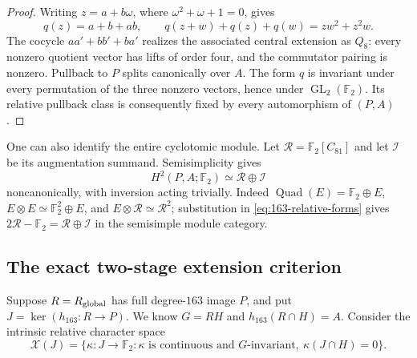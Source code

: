 \begin{proof}
Writing \(z=a+b\omega\), where
\(\omega^2+\omega+1=0\), gives
\[
 q(z)=a+b+ab,\qquad
 q(z+w)+q(z)+q(w)=zw^2+z^2w.
\]
The cocycle
\(aa'+bb'+ba'\) realizes the associated central extension
as \(Q_8\): every nonzero quotient vector has lifts of
order four, and the commutator pairing is nonzero.
Pullback to \(P\) splits canonically over \(A\).
The form \(q\) is invariant under every permutation
of the three nonzero vectors, hence under
\(\operatorname{GL}_2(\mathbb F_2)\).
Its relative pullback class is consequently fixed by
every automorphism of \((P,A)\).
\end{proof}

One can also identify the entire cyclotomic module.
Let \(\mathcal R=\mathbb F_2[C_{81}]\) and let
\(\mathcal I\) be its augmentation summand.
Semisimplicity gives
\[
 H^2(P,A;\mathbb F_2)\simeq\mathcal R\oplus\mathcal I
\]
noncanonically, with inversion acting trivially.
Indeed \(\operatorname{Quad}(E)=\mathbb F_2\oplus E\),
\(E\otimes E\simeq\mathbb F_2^2\oplus E\), and
\(E\otimes\mathcal R\simeq\mathcal R^2\); substitution
in \eqref{eq:163-relative-forms} gives
\(2\mathcal R-\mathbb F_2=\mathcal R\oplus\mathcal I\)
in the semisimple module category.

\subsection{The exact two-stage extension criterion}

Suppose \(R=R_{\rm global}\) has full degree-\(163\) image
\(P\), and put \(J=\ker(h_{163}:R\to P)\).
We know \(G=RH\) and \(h_{163}(R\cap H)=A\).
Consider the intrinsic relative character space
\[
 \mathscr X(J)=
 \{\kappa:J\to\mathbb F_2:
   \kappa\text{ is continuous and }G\text{-invariant},
   \ \kappa(J\cap H)=0\}.
\]

